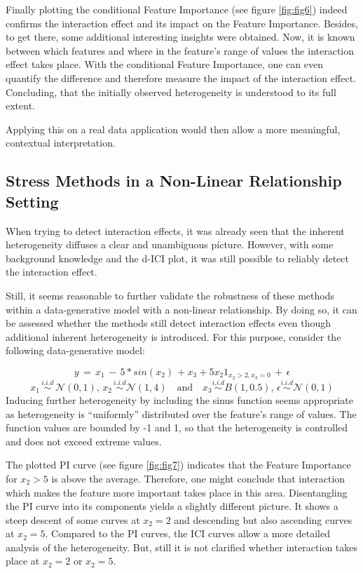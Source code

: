\documentclass[]{krantz}
\begin{document}
Finally plotting the conditional Feature Importance (see figure
\ref{fig:fig6}) indeed confirms the interaction effect and its impact on
the Feature Importance. Besides, to get there, some additional
interesting insights were obtained. Now, it is known between which
features and where in the feature's range of values the interaction
effect takes place. With the conditional Feature Importance, one can
even quantify the difference and therefore measure the impact of the
interaction effect. Concluding, that the initially observed
heterogeneity is understood to its full extent.

Applying this on a real data application would then allow a more
meaningful, contextual interpretation.

\subsection{Stress Methods in a Non-Linear Relationship
Setting}\label{ch323}

When trying to detect interaction effects, it was already seen that the
inherent heterogeneity diffuses a clear and unambiguous pícture.
However, with some background knowledge and the d-ICI plot, it was still
possible to reliably detect the interaction effect.

Still, it seems reasonable to further validate the robustness of these
methods within a data-generative model with a non-linear relationship.
By doing so, it can be assessed whether the methods still detect
interaction effects even though additional inherent heterogeneity is
introduced. For this purpose, consider the following data-generative
model:

\[y \, = \, x_{1} \,  - \, 5*sin(x_{2}) \, + x_{3} + 5x_{2} 1_{x_2 > 2, x_3 = 0} \, + \, \epsilon\]
\[ x_{1} \, \overset{i.i.d}{\sim} \, \mathcal{N}(0,1), \, x_{2} \, \overset{i.i.d}{\sim}  \mathcal{N}(1, 4) \quad \text{and} \quad x_{3} \overset{i.i.d}{\sim} B(1, 0.5),\,  \epsilon \overset{i.i.d}{\sim} \mathcal{N}(0, 1)\]
Inducing further heterogeneity by including the sinus function seems
appropriate as heterogeneity is ``uniformly'' distributed over the
feature's range of values. The function values are bounded by -1 and 1,
so that the heterogeneity is controlled and does not exceed extreme
values.

The plotted PI curve (see figure \ref{fig:fig7}) indicates that the
Feature Importance for \(x_2 > 5\) is above the average. Therefore, one
might conclude that interaction which makes the feature more important
takes place in this area. Disentangling the PI curve into its components
yields a slightly different picture. It shows a steep descent of some
curves at \(x_2 = 2\) and descending but also ascending curves at
\(x_2 = 5\). Compared to the PI curves, the ICI curves allow a more
detailed analysis of the heterogeneity. But, still it is not clarified
whether interaction takes place at \(x_2 = 2\) or \(x_2 = 5\).
\end{document}
